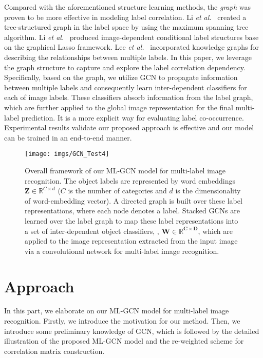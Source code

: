 \documentclass[10pt,twocolumn,letterpaper]{article}
\begin{document}
Compared with the aforementioned structure learning methods, the \emph{graph} was proven to be more effective in modeling label correlation. Li \emph{et al.}~\cite{tree} created a tree-structured graph in the label space by using the maximum spanning tree algorithm. Li \emph{et al.}~\cite{conditional} produced image-dependent conditional label structures base on the graphical Lasso framework. Lee \emph{et al.}~\cite{ml-zsl} incorporated knowledge graphs for describing the relationships between multiple labels. In this paper, we leverage the graph structure to capture and explore the label correlation dependency. Specifically, based on the graph, we utilize GCN to propagate information between multiple labels and consequently learn inter-dependent classifiers for each of image labels. These classifiers absorb information from the label graph, which are further applied to the global image representation for the final multi-label prediction. It is a more explicit way for evaluating label co-occurrence. Experimental results validate our proposed approach is effective and our model can be trained in an end-to-end manner. 

\begin{figure*}
	\centering
	\texttt{[image: imgs/GCN\_Test4]}
	\vspace{0.5em}
	\caption{Overall framework of our ML-GCN model for multi-label image recognition.
The object labels are represented by {word embeddings} $\bm{Z} \in \mathbb{R}^{C \times d}$ ($C$ is the number of categories and $d$ is the dimensionality of word-embedding vector). A directed graph is built over these label representations, where each node denotes a label. Stacked GCNs are learned over the label graph to map these label representations into a set of inter-dependent object classifiers, \ie, $\bm{W\in\mathbb{R}^{C\times{D}}}$, which are applied to the image representation extracted from the input image via a convolutional network for multi-label image recognition.}


\vspace{-0.5em}
	\label{fig:model}
\end{figure*}


\section{Approach}

In this part, we elaborate on our ML-GCN model for multi-label image recognition. Firstly, we introduce the motivation for our method. Then, we introduce some preliminary knowledge of GCN, which is followed by the detailed illustration of the proposed ML-GCN model and the re-weighted scheme for correlation matrix construction.
\end{document}
